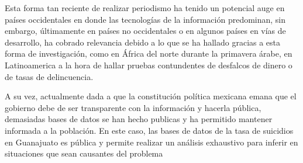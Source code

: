 \documentclass[11pt,DIV=9, letterpaper, oneside, openright]{scrartcl}
\begin{document}
Esta forma tan reciente de realizar periodismo ha tenido un potencial auge en países occidentales en donde las tecnologías de la información predominan, sin embargo, últimamente en países no occidentales o en algunos países en vías de desarrollo, ha cobrado relevancia debido a lo que se ha hallado gracias a esta forma de investigación, como en África del norte durante la primavera árabe, en Latinoamerica a la hora de hallar pruebas contundentes de desfalcos de dinero o de tasas de delincuencia.

A su vez, actualmente dada a que la constitución política mexicana emana que el gobierno debe de ser transparente con la información y hacerla pública, demasiadas bases de datos se han hecho publicas y ha permitido mantener informada a la población. En este caso, las bases de datos de la tasa de suicidios en Guanajuato es pública y permite realizar un análisis exhaustivo para inferir en situaciones que sean causantes del problema 

 

\end{document}
